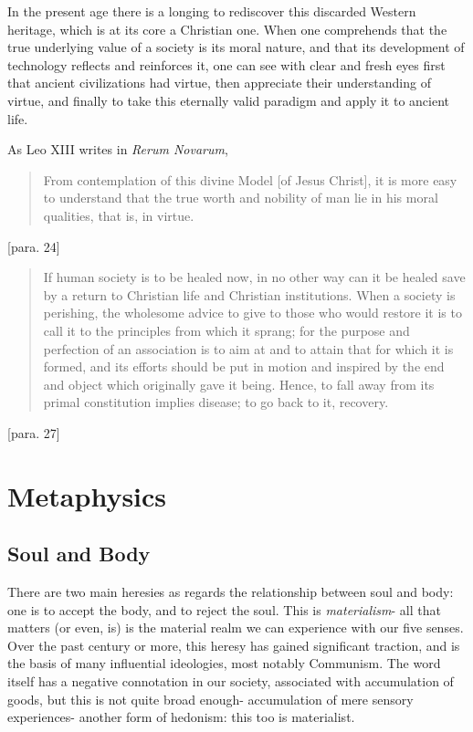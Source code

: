 \documentclass[letterpaper]{article}
\begin{document}
In the present age there is a longing to rediscover this discarded Western heritage, which is at its core a Christian one. When one comprehends that the true underlying value of a society is its moral nature, and that its development of technology reflects and reinforces it, one can see with clear and fresh eyes first that ancient civilizations had virtue, then appreciate their understanding of virtue, and finally to take this eternally valid paradigm and apply it to ancient life.

As Leo XIII writes in \textit{Rerum Novarum},

\begin{quote}
  From contemplation of this divine Model [of Jesus Christ], it is more easy to understand that the true worth and nobility of man lie in his moral qualities, that is, in virtue.
\end{quote} [para. 24]

\begin{quote}
  If human society is to be healed now, in no other way can it be healed save by a return to Christian life and Christian institutions. When a society is perishing, the wholesome advice to give to those who would restore it is to call it to the principles from which it sprang; for the purpose and perfection of an association is to aim at and to attain that for which it is formed, and its efforts should be put in motion and inspired by the end and object which originally gave it being. Hence, to fall away from its primal constitution implies disease; to go back to it, recovery.
\end{quote} [para. 27]

\section{Metaphysics}

\subsection{Soul and Body}

There are two main heresies as regards the relationship between soul and body: one is to accept the body, and to reject the soul. This is \textit{materialism}- all that matters (or even, is) is the material realm we can experience with our five senses. Over the past century or more, this heresy has gained significant traction, and is the basis of many influential ideologies, most notably Communism. The word itself has a negative connotation in our society, associated with accumulation of goods, but this is not quite broad enough- accumulation of mere sensory experiences- another form of hedonism: this too is materialist.
\end{document}
